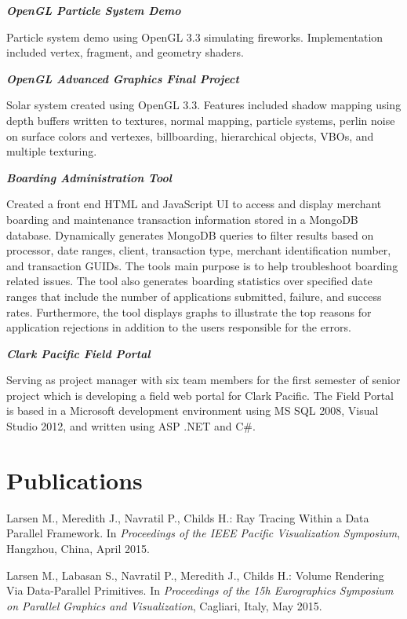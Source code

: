 \documentclass[margin,line]{res}
\begin{document}
\begin{resume}
{\em \textbf{OpenGL Particle System Demo} }

\vspace{-.4cm}
Particle system demo using OpenGL 3.3 simulating fireworks. Implementation included vertex, fragment, and geometry shaders.

{\em \textbf{OpenGL Advanced Graphics Final Project} }

\vspace{-.4cm}
Solar system created using OpenGL 3.3. Features included shadow mapping using depth buffers written to textures, normal mapping, particle systems, perlin noise on surface colors and vertexes, billboarding, hierarchical objects, VBOs, and multiple texturing.

{\em \textbf{Boarding Administration Tool} }

\vspace{-.4cm}
Created a front end HTML and JavaScript UI to access and display merchant boarding and maintenance transaction information stored in a MongoDB database. Dynamically generates MongoDB queries to filter results based on processor, date ranges, client, transaction type, merchant identification number, and transaction GUIDs. The tools main purpose is to help troubleshoot boarding related issues. The tool also generates boarding statistics over specified date ranges that include the number of applications submitted, failure, and success rates. Furthermore, the tool displays graphs to illustrate the top reasons for application rejections in addition to the users responsible for the errors.

{\em \textbf{Clark Pacific Field Portal } }

\vspace{-.4cm}
Serving as project manager with six team members for the first semester of senior project which is developing a field web portal for Clark Pacific. The Field Portal is based in a Microsoft development environment using MS SQL 2008, Visual Studio 2012, and written using ASP .NET and C\#. 

\section{\sc Publications}
Larsen M., Meredith J., Navratil P., Childs H.: Ray Tracing Within a Data Parallel Framework. In \textit{Proceedings of the IEEE Pacific Visualization Symposium}, Hangzhou, China, April 2015.
     
Larsen M., Labasan S., Navratil P., Meredith J., Childs H.: Volume Rendering Via Data-Parallel Primitives. In \textit{Proceedings of the 15h Eurographics Symposium on Parallel Graphics and Visualization}, Cagliari, Italy, May 2015.


\end{resume}
\end{document}
